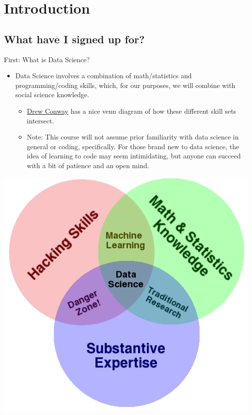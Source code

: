 \documentclass[
  letterpaper,
  DIV=11,
  numbers=noendperiod]{scrreprt}
\providecommand{\tightlist}{%
  \setlength{\itemsep}{0pt}\setlength{\parskip}{0pt}}\usepackage{longtable,booktabs,array}
\begin{document}

\hypertarget{introduction}{%
\chapter{Introduction}\label{introduction}}

\hypertarget{what-have-i-signed-up-for}{%
\section{What have I signed up for?}\label{what-have-i-signed-up-for}}

First: What is Data Science?

\begin{itemize}
\tightlist
\item
  Data Science involves a combination of math/statistics and
  programming/coding skills, which, for our purposes, we will combine
  with social science knowledge.

  \begin{itemize}
  \tightlist
  \item
    \href{http://drewconway.com/zia/2013/3/26/the-data-science-venn-diagram}{Drew
    Conway} has a nice venn diagram of how these different skill sets
    intersect.
  \item
    Note: This course will not assume prior familiarity with data
    science in general or coding, specifically. For those brand new to
    data science, the idea of learning to code may seem intimidating,
    but anyone can succeed with a bit of patience and an open mind.
  \end{itemize}
\end{itemize}

\includegraphics{images/venn.png}
\end{document}
